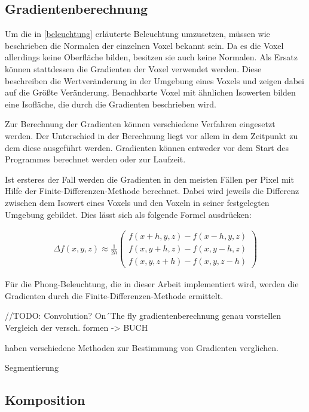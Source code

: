 \citet{phong75}

\subsection{Gradientenberechnung}

Um die in \ref{beleuchtung} erläuterte Beleuchtung umzusetzen, müssen wie beschrieben die Normalen der einzelnen Voxel bekannt sein. Da es die Voxel allerdings keine Oberfläche bilden, besitzen sie auch keine Normalen. Als Ersatz können stattdessen die Gradienten der Voxel verwendet werden. Diese beschreiben die Wertveränderung in der Umgebung eines Voxels und zeigen dabei auf die Größte Veränderung. Benachbarte Voxel mit ähnlichen Isowerten bilden eine Isofläche, die durch die Gradienten beschrieben wird. 

Zur Berechnung der Gradienten können verschiedene Verfahren eingesetzt werden. Der Unterschied in der Berechnung liegt vor allem in dem Zeitpunkt zu dem diese ausgeführt werden. Gradienten können entweder vor dem Start des Programmes berechnet werden oder zur Laufzeit. 

Ist ersteres der Fall werden die Gradienten in den meisten Fällen per Pixel mit Hilfe der Finite-Differenzen-Methode berechnet. 
Dabei wird jeweils die Differenz zwischen dem Isowert eines Voxels und den Voxeln in seiner festgelegten Umgebung gebildet. Dies lässt sich als folgende Formel ausdrücken: 

\begin{align}
\Delta f(x,y,z)\approx \frac{1}{2h}
\left ( \begin{matrix}
f(x + h, y, z) - f(x - h, y, z)\\ 
f(x, y + h, z) - f(x, y - h, z)\\ 
f(x, y, z + h) - f(x, y, z - h)
\end{matrix} \right )
\end{align}

Für die Phong-Beleuchtung, die in dieser Arbeit implementiert wird, werden die Gradienten durch die Finite-Differenzen-Methode ermittelt. 

//TODO:
Convolution?
On´The fly gradientenberechnung
genau vorstellen
Vergleich der versch. formen -> BUCH

\citet{Correa11} haben verschiedene Methoden zur Bestimmung von Gradienten verglichen.

Segmentierung

\subsection{Komposition}

